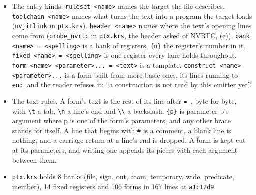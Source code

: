 \begin{enumerate}
\begin{itemize}
\begin{enumerate}
\begin{itemize}
\begin{itemize}
\item The entry kinds. \texttt{ruleset <name>} names the target the file describes. \texttt{toolchain <name>} names what turns the text into a program the target loads (\texttt{nvjitlink} in \texttt{ptx.\allowbreak{}krs}). \texttt{header <name>} names where the text's opening lines come from (\texttt{probe\_\allowbreak{}nvrtc} in \texttt{ptx.\allowbreak{}krs}, the header asked of NVRTC, (e)). \texttt{bank <name> = <spelling>} is a bank of registers, \texttt{\{n\}} the register's number in it. \texttt{fixed <name> = <spelling>} is one register every lane holds throughout. \texttt{form <name> <parameter>... = <text>} is a template. \texttt{construct <name> <parameter>...} is a form built from more basic ones, its lines running to \texttt{end}, and the reader refuses it: “a construction is not read by this emitter yet”.
\item The text rules. A form's text is the rest of its line after \texttt{= }, byte for byte, with \texttt{\textbackslash{}t} a tab, \texttt{\textbackslash{}n} a line's end and \texttt{\textbackslash{}\textbackslash{}} a backslash. \texttt{\{p\}} is parameter p's argument where p is one of the form's parameters, and any other brace stands for itself. A line that begins with \texttt{\#} is a comment, a blank line is nothing, and a carriage return at a line's end is dropped. A form is kept cut at its parameters, and writing one appends its pieces with each argument between them.
\item \texttt{ptx.\allowbreak{}krs} holds 8 banks (file, sign, out, atom, temporary, wide, predicate, member), 14 fixed registers and 106 forms in 167 lines at \texttt{a1c12d9}.

\end{itemize}
\end{itemize}
\end{enumerate}
\end{itemize}
\end{enumerate}
